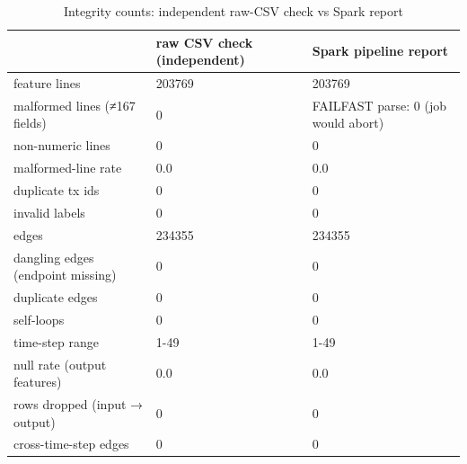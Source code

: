 \begin{table}
\caption{Integrity counts: independent raw-CSV check vs Spark report}
\label{tab:01_integrity}
\begin{tabular}{lll}
\toprule
 & raw CSV check (independent) & Spark pipeline report \\
\midrule
feature lines & 203769 & 203769 \\
malformed lines (≠167 fields) & 0 & FAILFAST parse: 0 (job would abort) \\
non-numeric lines & 0 & 0 \\
malformed-line rate & 0.0 & 0.0 \\
duplicate tx ids & 0 & 0 \\
invalid labels & 0 & 0 \\
edges & 234355 & 234355 \\
dangling edges (endpoint missing) & 0 & 0 \\
duplicate edges & 0 & 0 \\
self-loops & 0 & 0 \\
time-step range & 1-49 & 1-49 \\
null rate (output features) & 0.0 & 0.0 \\
rows dropped (input → output) & 0 & 0 \\
cross-time-step edges & 0 & 0 \\
\bottomrule
\end{tabular}
\end{table}

